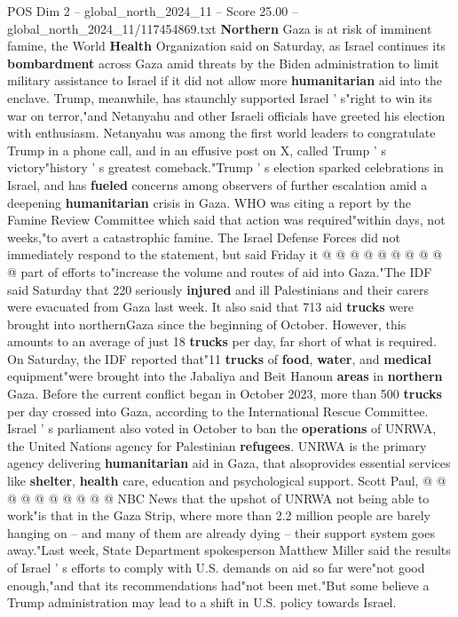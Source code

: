 \begin{textsample}{POS Dim 2 – global\_north\_2024\_11 – Score 25.00 – global\_north\_2024\_11/117454869.txt}  \label{ex:f2_pos_358}
\textbf{Northern} Gaza is at risk of imminent famine, the World \textbf{Health} Organization said on Saturday, as Israel continues its \textbf{bombardment} across Gaza amid threats by the Biden administration to limit military assistance to Israel if it did not allow more \textbf{humanitarian} aid into the enclave.
Trump, meanwhile, has staunchly supported Israel ' s"right to win its war on terror,"and Netanyahu and other Israeli officials have greeted his election with enthusiasm.
Netanyahu was among the first world leaders to congratulate Trump in a phone call, and in an effusive post on X, called Trump ' s victory"history ' s greatest comeback."Trump ' s election sparked celebrations in Israel, and has \textbf{fueled} concerns among observers of further escalation amid a deepening \textbf{humanitarian} crisis in Gaza.
WHO was citing a report by the Famine Review Committee which said that action was required"within days, not weeks,"to avert a catastrophic famine.
The Israel Defense Forces did not immediately respond to the statement, but said Friday it @ @ @ @ @ @ @ @ @ @ part of efforts to"increase the volume and routes of aid into Gaza."The IDF said Saturday that 220 seriously \textbf{injured} and ill Palestinians and their carers were evacuated from Gaza last week.
It also said that 713 aid \textbf{trucks} were brought into northernGaza since the beginning of October.
However, this amounts to an average of just 18 \textbf{trucks} per day, far short of what is required.
On Saturday, the IDF reported that"11 \textbf{trucks} of \textbf{food}, \textbf{water}, and \textbf{medical} equipment"were brought into the Jabaliya and Beit Hanoun \textbf{areas} in \textbf{northern} Gaza.
Before the current conflict began in October 2023, more than 500 \textbf{trucks} per day crossed into Gaza, according to the International Rescue Committee.
Israel ' s parliament also voted in October to ban the \textbf{operations} of UNRWA, the United Nations agency for Palestinian \textbf{refugees}.
UNRWA is the primary agency delivering \textbf{humanitarian} aid in Gaza, that alsoprovides essential services like \textbf{shelter}, \textbf{health} care, education and psychological support.
Scott Paul, @ @ @ @ @ @ @ @ @ @ NBC News that the upshot of UNRWA not being able to work"is that in the Gaza Strip, where more than 2.2 million people are barely hanging on -- and many of them are already dying -- their support system goes away."Last week, State Department spokesperson Matthew Miller said the results of Israel ' s efforts to comply with U.S. demands on aid so far were"not good enough,"and that its recommendations had"not been met."But some believe a Trump administration may lead to a shift in U.S. policy towards Israel.

\end{textsample}
